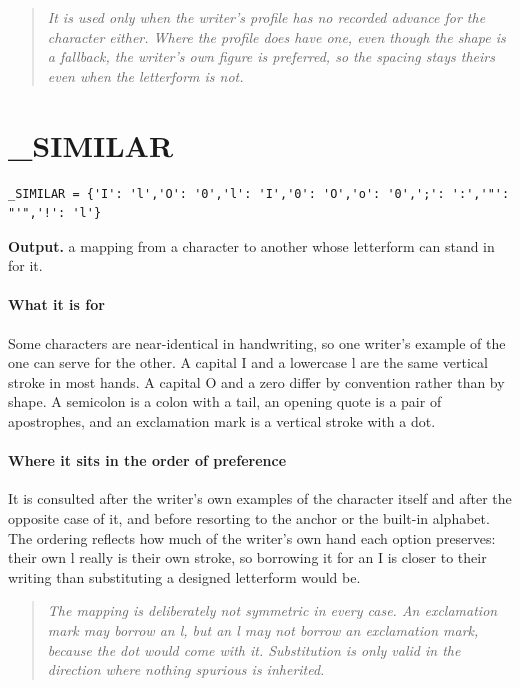 \begin{quote}\small\itshape It is used only when the writer's profile has no recorded advance for the character either. Where the profile does have one, even though the shape is a fallback, the writer's own figure is preferred, so the spacing stays theirs even when the letterform is not.\end{quote}

\section{\_SIMILAR}
\begin{lstlisting}[style=sig]
_SIMILAR = {'I': 'l','O': '0','l': 'I','0': 'O','o': '0',';': ':','"': "'",'!': 'l'}
\end{lstlisting}

\noindent\textbf{Output.} a mapping from a character to another whose letterform can stand in for it.


\paragraph{What it is for}
Some characters are near-identical in handwriting, so one writer's example of the one can serve for the other. A capital I and a lowercase l are the same vertical stroke in most hands. A capital O and a zero differ by convention rather than by shape. A semicolon is a colon with a tail, an opening quote is a pair of apostrophes, and an exclamation mark is a vertical stroke with a dot.


\paragraph{Where it sits in the order of preference}
It is consulted after the writer's own examples of the character itself and after the opposite case of it, and before resorting to the anchor or the built-in alphabet. The ordering reflects how much of the writer's own hand each option preserves: their own l really is their own stroke, so borrowing it for an I is closer to their writing than substituting a designed letterform would be.


\begin{quote}\small\itshape The mapping is deliberately not symmetric in every case. An exclamation mark may borrow an l, but an l may not borrow an exclamation mark, because the dot would come with it. Substitution is only valid in the direction where nothing spurious is inherited.\end{quote}

